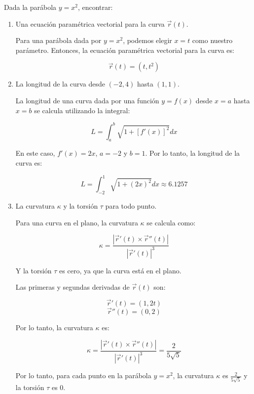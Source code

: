 \documentclass{article}
\begin{document}
Dada la parábola \(y = x^2\), encontrar:

\begin{enumerate}
\item Una ecuación paramétrica vectorial para la curva \(\vec{r}(t)\).

Para una parábola dada por \(y = x^2\), podemos elegir \(x = t\) como nuestro parámetro. Entonces, la ecuación paramétrica vectorial para la curva es:

\[
\vec{r}(t) = (t, t^2)
\]

\item La longitud de la curva desde \((-2, 4)\) hasta \((1, 1)\).

La longitud de una curva dada por una función \(y = f(x)\) desde \(x = a\) hasta \(x = b\) se calcula utilizando la integral:

\[
L = \int_{a}^{b} \sqrt{1 + [f'(x)]^2} dx
\]

En este caso, \(f'(x) = 2x\), \(a = -2\) y \(b = 1\). Por lo tanto, la longitud de la curva es:

\[
L = \int_{-2}^{1} \sqrt{1 + (2x)^2} dx \approx 6.1257
\]

\item La curvatura \(\kappa\) y la torsión \(\tau\) para todo punto.

Para una curva en el plano, la curvatura \(\kappa\) se calcula como:

\[
\kappa = \frac{|\vec{r}'(t) \times \vec{r}''(t)|}{|\vec{r}'(t)|^3}
\]

Y la torsión \(\tau\) es cero, ya que la curva está en el plano.

Las primeras y segundas derivadas de \(\vec{r}(t)\) son:

\[
\vec{r}'(t) = (1, 2t)
\]
\[
\vec{r}''(t) = (0, 2)
\]

Por lo tanto, la curvatura \(\kappa\) es:

\[
\kappa = \frac{|\vec{r}'(t) \times \vec{r}''(t)|}{|\vec{r}'(t)|^3} = \frac{2}{5 \sqrt{5}}
\]

Por lo tanto, para cada punto en la parábola \(y = x^2\), la curvatura \(\kappa\) es \(\frac{2}{5 \sqrt{5}}\) y la torsión \(\tau\) es 0.

\end{enumerate}
\end{document}

